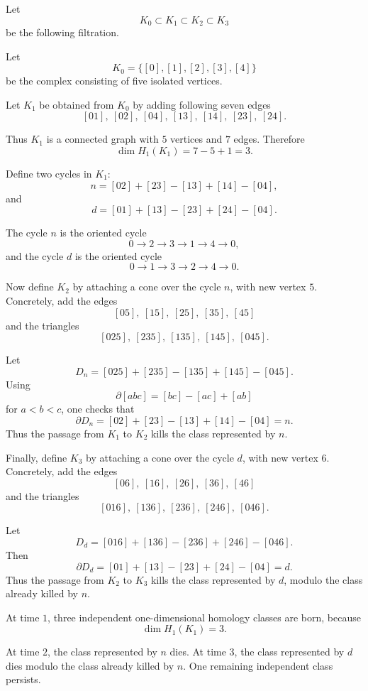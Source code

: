 \documentclass[11pt]{amsart}
\theoremstyle{theorem}
\theoremstyle{remark}
\theoremstyle{definition}
\begin{document}
Let
\[
K_0\subset K_1\subset K_2\subset K_3
\]
be the following filtration.

Let
\[
K_0=\{[0],[1],[2],[3],[4]\}
\]
be the complex consisting of five isolated vertices.

Let \(K_1\) be obtained from \(K_0\) by adding following seven edges
\[
[01],\ [02],\ [04],\ [13],\ [14],\ [23],\ [24].
\]

Thus \(K_1\) is a connected graph with
$5$ vertices and $7$ edges.
Therefore
\[
\dim H_1(K_1)=7-5+1=3.
\]

Define two cycles in \(K_1\):
\[
n=[02]+[23]-[13]+[14]-[04],
\]
and
\[
d=[01]+[13]-[23]+[24]-[04].
\]

The cycle \(n\) is the oriented cycle
\[
0\to 2\to 3\to 1\to 4\to 0,
\]
and the cycle \(d\) is the oriented cycle
\[
0\to 1\to 3\to 2\to 4\to 0.
\]

Now define \(K_2\) by attaching a cone over the cycle \(n\), with new vertex
\(5\). Concretely, add the edges
\[
[05],\ [15],\ [25],\ [35],\ [45]
\]
and the triangles
\[
[025],\ [235],\ [135],\ [145],\ [045].
\]

Let
\[
D_n=[025]+[235]-[135]+[145]-[045].
\]
Using
\[
\partial[abc]=[bc]-[ac]+[ab]
\]
for \(a<b<c\), one checks that
\[
\partial D_n
=
[02]+[23]-[13]+[14]-[04]
=
n.
\]
Thus the passage from \(K_1\) to \(K_2\) kills the class represented by \(n\).

Finally, define \(K_3\) by attaching a cone over the cycle \(d\), with new
vertex \(6\). Concretely, add the edges
\[
[06],\ [16],\ [26],\ [36],\ [46]
\]
and the triangles
\[
[016],\ [136],\ [236],\ [246],\ [046].
\]

Let
\[
D_d=[016]+[136]-[236]+[246]-[046].
\]
Then
\[
\partial D_d
=
[01]+[13]-[23]+[24]-[04]
=
d.
\]
Thus the passage from \(K_2\) to \(K_3\) kills the class represented by \(d\),
modulo the class already killed by \(n\).


At time \(1\), three independent one-dimensional homology classes are born,
because
\[
\dim H_1(K_1)=3.
\]

At time \(2\), the class represented by \(n\) dies. At time \(3\), the class
represented by \(d\) dies modulo the class already killed by \(n\). One
remaining independent class persists.
\end{document}
